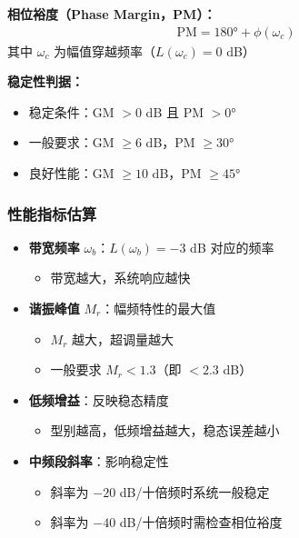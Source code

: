 \textbf{相位裕度（Phase Margin，PM）：}
\begin{align*}
\text{PM} = 180° + \phi(\omega_c)
\end{align*}
其中 $\omega_c$ 为幅值穿越频率（$L(\omega_c) = 0$ dB）

\textbf{稳定性判据：}
\begin{itemize}
    \item 稳定条件：GM $> 0$ dB 且 PM $> 0°$
    \item 一般要求：GM $\geq 6$ dB，PM $\geq 30°$
    \item 良好性能：GM $\geq 10$ dB，PM $\geq 45°$
\end{itemize}

\subsubsection{性能指标估算}
\begin{itemize}
    \item \textbf{带宽频率} $\omega_b$：$L(\omega_b) = -3$ dB 对应的频率
    \begin{itemize}
        \item 带宽越大，系统响应越快
    \end{itemize}
    \item \textbf{谐振峰值} $M_r$：幅频特性的最大值
    \begin{itemize}
        \item $M_r$ 越大，超调量越大
        \item 一般要求 $M_r < 1.3$（即 $< 2.3$ dB）
    \end{itemize}
    \item \textbf{低频增益}：反映稳态精度
    \begin{itemize}
        \item 型别越高，低频增益越大，稳态误差越小
    \end{itemize}
    \item \textbf{中频段斜率}：影响稳定性
    \begin{itemize}
        \item 斜率为 $-20$ dB/十倍频时系统一般稳定
        \item 斜率为 $-40$ dB/十倍频时需检查相位裕度
    \end{itemize}
\end{itemize}
